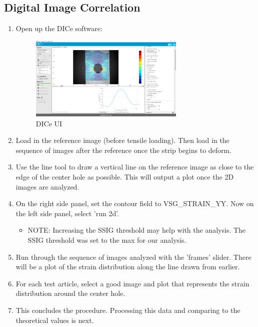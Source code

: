 \documentclass{article}
\begin{document}
\subsection{Digital Image Correlation}
\begin{enumerate}
\item Open up the DICe software:
\begin{figure}[H]
    \centering
    \includegraphics[width = 0.7\textwidth]{lab9images/DICE_software_page.PNG}
    \caption{DICe UI}
    \label{fig:dice}
\end{figure}

\item Load in the reference image (before tensile loading). Then load in the sequence of images after the reference once the strip begins to deform.

\item Use the line tool to draw a vertical line on the reference image as close to the edge of the center hole as possible. This will output a plot once the 2D images are analyzed.

\item On the right side panel, set the contour field to VSG\_STRAIN\_YY. Now on the left side panel, select 'run 2d'.
\begin{itemize}
    \item NOTE: Increasing the SSIG threshold may help with the analysis. The SSIG threshold was set to the max for our analysis.
\end{itemize}

 \item Run through the sequence of images analyzed with the 'frames' slider. There will be a plot of the strain distribution along the line drawn from earlier. 

 \item For each test article, select a good image and plot that represents the strain distribution around the center hole.

 \item This concludes the procedure. Processing this data and comparing to the theoretical values is next.

\end{enumerate}
\hypertarget{datapro}{}
\end{document}
